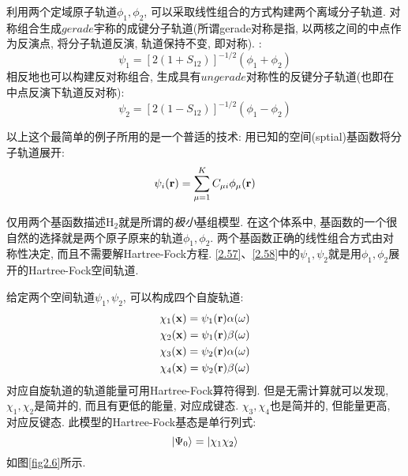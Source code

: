 利用两个定域原子轨道$\phi_1,\phi_2$, 
可以采取线性组合的方式构建两个离域分子轨道. 
对称组合生成$gerade$宇称的成键分子轨道(所谓gerade对称是指, 
以两核之间的中点作为反演点, 
将分子轨道反演, 
轨道保持不变, 
即对称).
:
\begin{equation}
\label{2.57}
\psi_1=[2(1+S_{12})]^{-1/2}(\phi_1+\phi_2)
\end{equation}
相反地也可以构建反对称组合, 
生成具有$ungerade$对称性的反键分子轨道(也即在中点反演下轨道反对称):
\begin{equation}
\label{2.58}
\psi_2=[2(1-S_{12})]^{-1/2}(\phi_1-\phi_2)
\end{equation}

以上这个最简单的例子所用的是一个普适的技术: 用已知的空间(sptial)基函数将分子轨道展开: 
\begin{equation}
\label{2.59}
\psi_i(\mathbf{r})=\sum_{\mu=1}^{K}C_{\mu i}\phi_{\mu}(\mathbf{r})
\end{equation} 

仅用两个基函数描述H$_2$就是所谓的\emph{极小}基组模型. 
在这个体系中, 
基函数的一个很自然的选择就是两个原子原来的轨道$\phi_1,\phi_2$. 
两个基函数正确的线性组合方式由对称性决定, 
而且不需要解Hartree-Fock方程. 
\ref{2.57}、\ref{2.58}中的$\psi_1,\psi_2$就是用$\phi_1,\phi_2$展开的Hartree-Fock空间轨道.


给定两个空间轨道$\psi_1,\psi_2$, 
可以构成四个自旋轨道:
\begin{equation}
\begin{split}
\chi_1(\mathbf{x})=\psi_1(\mathbf{r})\alpha(\omega)\\
\chi_2(\mathbf{x})=\psi_1(\mathbf{r})\beta(\omega)\\
\chi_3(\mathbf{x})=\psi_2(\mathbf{r})\alpha(\omega)\\
\chi_4(\mathbf{x})=\psi_2(\mathbf{r})\beta(\omega)
\end{split}
\label{2.60}
\end{equation}
对应自旋轨道的轨道能量可用Hartree-Fock算符得到. 
但是无需计算就可以发现, 
$\chi_1,\chi_2$是简并的, 
而且有更低的能量, 
对应成键态. 
$\chi_3,\chi_4$也是简并的, 
但能量更高, 
对应反键态. 
此模型的Hartree-Fock基态是单行列式:
\begin{equation}
\Ket{\Psi_0}=\Ket{\chi_1\chi_2}
\end{equation}
如图\ref{fig2.6}所示.


